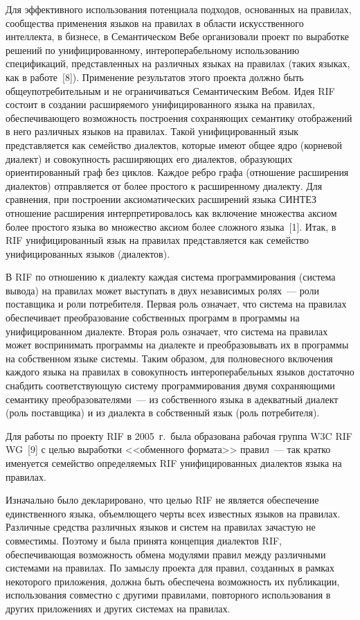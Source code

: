 \begin{multicols}{2}
Для эффективного использования потенциала подходов, основанных на правилах, 
сообщества применения языков на правилах в области искусственного интеллекта, в 
бизнесе, в Семантическом Вебе организовали проект по выработке решений по 
унифицированному, интероперабельному использованию спецификаций, представленных 
на различных языках на правилах (таких языках, как в работе~[8]). Применение 
результатов этого проекта должно быть общеупотребительным и не ограничиваться 
Семантическим Вебом. Идея RIF состоит в создании расширяемого унифицированного 
языка на правилах, обеспечивающего возможность построения сохраняющих семантику 
отображений в него различных языков на правилах. Такой унифицированный язык 
представляется как семейство диалектов, которые имеют общее ядро (корневой диалект) и 
совокупность расширяющих его диалектов, образующих ориентированный граф без цик\-лов. 
Каждое ребро графа (отношение расширения диалектов) отправляется от более простого к 
расширенному диалекту. Для сравнения, при построении аксиоматических расширений 
языка СИНТЕЗ отношение расширения интерпретировалось как включение множества 
аксиом более простого языка во множество аксиом более сложного языка~[1]. Итак, в RIF 
унифицированный язык на правилах представляется как семейство унифицированных 
языков (диалектов).

В RIF по отношению к диалекту каждая система программирования (система вывода) на 
правилах может выступать в двух независимых ролях~--- роли поставщика и роли 
потребителя. Первая роль означает, что система на правилах обеспечивает преобразование 
собственных программ в программы на унифицированном диалекте. Вторая роль означает, 
что система на правилах может воспринимать программы на диалекте и преобразовывать 
их в программы на собственном языке системы. Таким образом, для полновесного 
включения каждого языка на правилах в совокупность интероперабельных языков 
достаточно снабдить соответствующую систему программирования двумя сохраняющими 
семантику преобразователями~--- из собственного языка в адекватный диалект (роль 
поставщика) и из диалекта в собственный язык (роль потребителя). 

Для работы по проекту RIF в 2005~г.\ была образована рабочая группа W3C RIF WG~[9] с 
целью выработки <<обменного формата>> правил~--- так кратко именуется семейство 
определяемых RIF унифицированных диалектов языка на правилах. 

Изначально было 
декларировано, что целью RIF не является обеспечение единственного языка, объемлющего 
черты всех известных языков на правилах. Различные средства различных языков и систем 
на правилах зачастую не совместимы. Поэтому и была принята концепция диалектов RIF, 
обеспечи\-ва\-ющая возможность обмена модулями правил между различными системами на 
правилах. По замыслу проекта для правил, созданных в рамках некоторого приложения, 
должна быть обеспечена возможность их публикации, использования совместно с другими 
правилами, повторного использования в других приложениях и других сис\-те\-мах на 
правилах.


\end{multicols}
